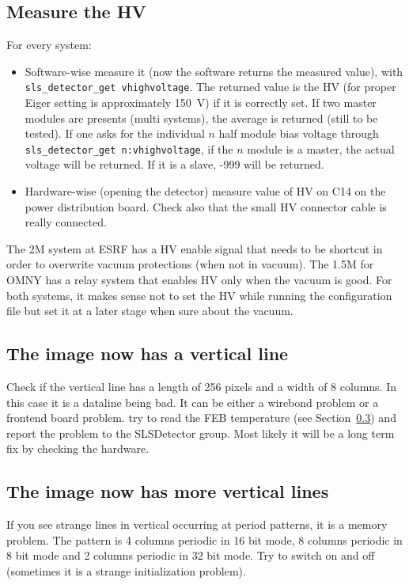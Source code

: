 \documentclass{article}
\begin{document}
\subsection{Measure the HV}
For every system: 
\begin{itemize}
\item Software-wise measure it (now the software returns the measured value), with {\tt{sls\_detector\_get vhighvoltage}}. The returned value is the HV (for proper Eiger setting is approximately 150~V) if it is correctly set. If two master modules are presents (multi systems), the average is returned (still to be tested). If one asks for the individual $n$ half module bias voltage through {\tt{sls\_detector\_get n:vhighvoltage}}, if the $n$ module is a master, the actual voltage will be returned. If it is a slave, -999 will be returned. 
\item Hardware-wise (opening the detector) measure value of HV on C14 on the power distribution board. Check also that the small HV connector cable is really connected. 
 \end{itemize}

The 2M system at ESRF has a HV enable signal that needs to be shortcut in order to overwrite vacuum protections (when not in vacuum). 
The 1.5M for OMNY has a relay system that enables HV only when the vacuum is good. 
For both systems, it makes sense not to set the HV while running the configuration file but set it at a later stage when sure about the vacuum. 

\subsection{The image now has a vertical line}
Check if the vertical line has a length of 256 pixels and a width of 8 columns. In this case it is a dataline being bad. It can be either a wirebond problem or a frontend board problem. try to read the FEB temperature (see Section~\ref{}) and report the problem to the SLSDetector group. Most likely it will be a long term fix by checking the hardware.

\subsection{The image now has more vertical lines}

If you see strange lines in vertical occurring at period patterns, it is a memory problem. The pattern is 4 columns periodic in 16 bit mode, 8 columns periodic in 8 bit mode and 2 columns periodic in 32 bit mode. Try to switch on and off (sometimes it is a strange initialization problem).
\end{document}
